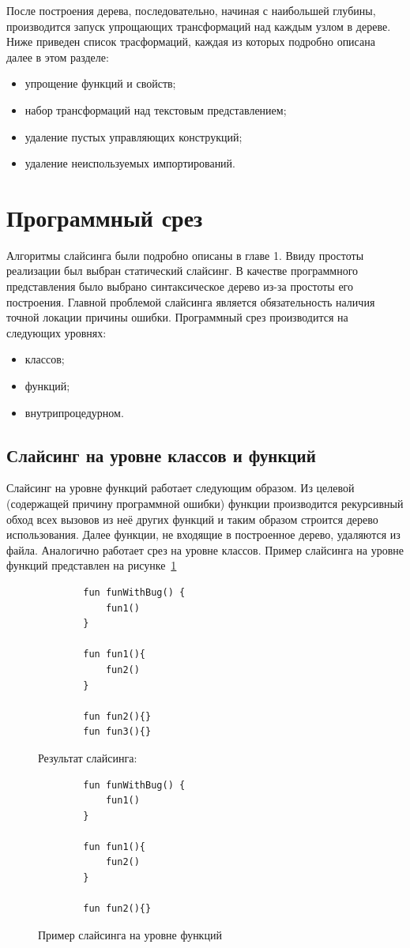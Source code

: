 После построения дерева, последовательно, начиная с наибольшей глубины, производится запуск упрощающих трансформаций над каждым узлом в дереве. Ниже приведен список трасформаций, каждая из которых подробно описана далее в этом разделе:
\begin{itemize}
	\item упрощение функций и свойств;
	\item набор трансформаций над текстовым представлением;
	\item удаление пустых управляющих конструкций;
	\item удаление неиспользуемых импортирований.
\end{itemize}

\section{Программный срез}
Алгоритмы слайсинга были подробно описаны в главе 1. Ввиду простоты реализации был выбран статический слайсинг. В качестве программного представления было выбрано синтаксическое дерево из-за простоты его построения. Главной проблемой слайсинга является обязательность наличия точной локации причины ошибки.
Программный срез производится на следующих уровнях:
\begin{itemize}
	\item классов;
	\item функций;
	\item внутрипроцедурном.
\end{itemize}
\subsection{Слайсинг на уровне классов и функций}
Слайсинг на уровне функций работает следующим образом. Из целевой (содержащей причину программной ошибки) функции производится рекурсивный обход всех вызовов из неё других функций и таким образом строится дерево использования. Далее функции, не входящие в построенное дерево, удаляются из файла. Аналогично работает срез на уровне классов. Пример слайсинга на уровне функций представлен на рисунке~\ref{funslicing}
\begin{figure}
	\begin{lstlisting}
		fun funWithBug() {
			fun1()
		}
		
		fun fun1(){
			fun2()		
		}
		
		fun fun2(){}
		fun fun3(){}
	\end{lstlisting}
	Результат слайсинга:
	\begin{lstlisting}
		fun funWithBug() {
			fun1()
		}
		
		fun fun1(){
			fun2()		
		}
		
		fun fun2(){}
	\end{lstlisting}
	\caption{\label{funslicing}Пример слайсинга на уровне функций}
\end{figure}
